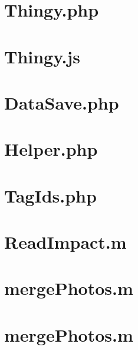 \section{Thingy.php}\label{cd:Thingy.php}


\section{Thingy.js}\label{cd:Thingy.js}


\section{DataSave.php}\label{cd:DataSave.php}


\section{Helper.php}\label{cd:Helper.php}


\section{TagIds.php}\label{cd:TagIds.php}


\section{ReadImpact.m}\label{cd:readImpact}


\section{mergePhotos.m}\label{cd:accCalibration}


\section{mergePhotos.m}\label{cd:mergePhotos}

